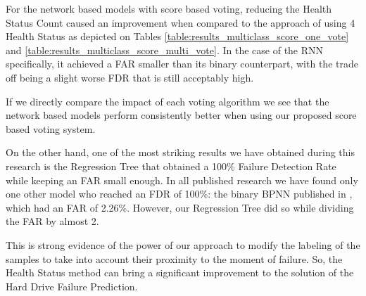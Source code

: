 For the network based models with score based voting, reducing the Health Status Count caused an improvement when compared to the approach of using 4 Health Status as depicted on Tables \ref{table:results_multiclass_score_one_vote} and \ref{table:results_multiclass_score_multi_vote}.
In the case of the RNN specifically, it achieved a FAR smaller than its binary counterpart, with the trade off being a slight worse FDR that is still acceptably high.

If we directly compare the impact of each voting algorithm we see that the network based models perform consistently better when using our proposed score based voting system.

On the other hand, one of the most striking results we have obtained during this research is the Regression Tree that obtained a 100\% Failure Detection Rate while keeping an FAR small enough.
In all published research we have found only one other model who reached an FDR of 100\%: the binary BPNN published in \cite{Zhu13}, which had an FAR of 2.26\%.
However, our Regression Tree did so while dividing the FAR by almost 2.

This is strong evidence of the power of our approach to modify the labeling of the samples to take into account their proximity to the moment of failure.
So, the Health Status method can bring a significant improvement to the solution of the Hard Drive Failure Prediction.